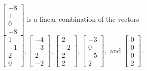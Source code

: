 \begin{exerciseAnswer}
\begin{enumerate}[(a)]
\( \left[\begin{array}{c}
-8 \\
1 \\
0 \\
-8
\end{array}\right] \) is a linear combination of the vectors \( \left[\begin{array}{c}
1 \\
-1 \\
2 \\
0
\end{array}\right] , \left[\begin{array}{c}
-4 \\
-3 \\
2 \\
-2
\end{array}\right] , \left[\begin{array}{c}
2 \\
-2 \\
2 \\
2
\end{array}\right] , \left[\begin{array}{c}
-3 \\
0 \\
-5 \\
2
\end{array}\right] , \text{ and } \left[\begin{array}{c}
0 \\
0 \\
0 \\
2
\end{array}\right] \). 


\end{enumerate}
    
\end{exerciseAnswer}
    
